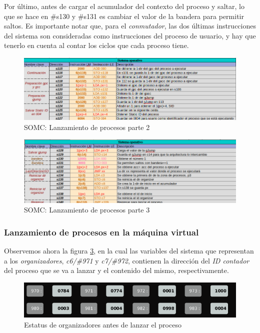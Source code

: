 \documentclass[letterpaper,12pt,oneside]{book}
\begin{document}
        Por último, antes de cargar el acumulador del contexto del proceso y saltar, lo que se hace en \#s130 y \#s131 es cambiar el valor
		de la bandera para permitir saltos. Es importante notar que, para el \textit{conmutador}, las dos últimas instrucciones del 
		sistema son consideradas como instrucciones del proceso de usuario, y hay 
		que tenerlo en cuenta al contar los ciclos que cada proceso tiene.
		
		
		\begin{figure}[h]		
			\centering
			\includegraphics[scale=0.53]{media/CARDIACC/SO_EjecutarProceso2.png}
			\caption{ SOMC: Lanzamiento de procesos parte 2 }
			\label{fig:somcLanzamientoP2}
		\end{figure}
		
		\begin{figure}[h]		
			\centering
			\includegraphics[scale=0.53]{media/CARDIACC/SO_EjecutarProceso3.png}
			\caption{ SOMC: Lanzamiento de procesos parte 3 }
			\label{fig:somcLanzamientoP3}
		\end{figure}

		\subsubsection{Lanzamiento de procesos en la máquina virtual}		
		
		Observemos ahora la figura \ref{fig:varSisStatExec1}, en la cual
		las variables del sistema que representan a los \textit{organizadores}, \textit{c6/\#971} y \textit{c7/\#972}, contienen la dirección del 
		\textit{ID contador} del proceso que se va
		a lanzar y el contenido del mismo, respectivamente.
		
		\begin{figure}[h]		
			\centering
			\includegraphics[scale=0.65]{media/CARDIACC/VariablesSistemaEstatusExec1.png}
			\caption{ Estatus de organizadores antes de lanzar el proceso}
			\label{fig:varSisStatExec1}
		\end{figure}
		
\end{document}
